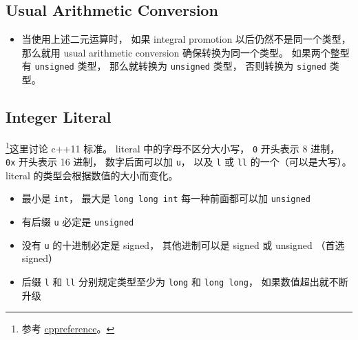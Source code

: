 \subsection{Usual Arithmetic Conversion}
\begin{itemize}
\item 当使用上述二元运算时， 如果 integral promotion 以后仍然不是同一个类型， 那么就用 usual arithmetic conversion 确保转换为同一个类型。 如果两个整型有 \verb|unsigned| 类型， 那么就转换为 \verb|unsigned| 类型， 否则转换为 \verb|signed| 类型。
\end{itemize}

\subsection{Integer Literal}
\footnote{参考 \href{https://en.cppreference.com/w/cpp/language/integer_literal}{cppreference}。}这里讨论 c++11 标准。 literal 中的字母不区分大小写， \verb|0| 开头表示 8 进制，  \verb|0x| 开头表示 16 进制， 数字后面可以加 \verb|u|， 以及 \verb|l| 或 \verb|ll| 的一个（可以是大写）。 literal 的类型会根据数值的大小而变化。

\begin{itemize}
\item 最小是 \verb|int|， 最大是 \verb|long long int| 每一种前面都可以加 \verb|unsigned|
\item 有后缀 \verb|u| 必定是 \verb|unsigned|
\item 没有 \verb|u| 的十进制必定是 signed， 其他进制可以是 signed 或 unsigned （首选 signed）
\item 后缀 \verb|l| 和 \verb|ll| 分别规定类型至少为 \verb|long| 和 \verb|long long|， 如果数值超出就不断升级
\end{itemize}
